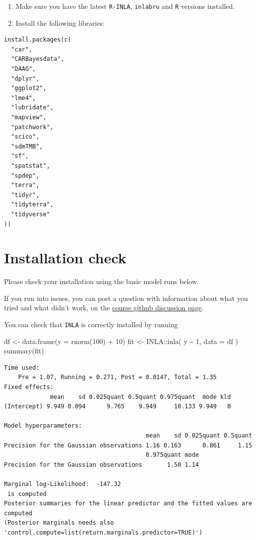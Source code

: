 \documentclass[
  letterpaper,
  DIV=11,
  numbers=noendperiod]{scrartcl}
\newenvironment{Shaded}{\begin{snugshade}}{\end{snugshade}}
\newcommand{\AttributeTok}[1]{\textcolor[rgb]{0.40,0.45,0.13}{#1}}
\newcommand{\DecValTok}[1]{\textcolor[rgb]{0.68,0.00,0.00}{#1}}
\newcommand{\FunctionTok}[1]{\textcolor[rgb]{0.28,0.35,0.67}{#1}}
\newcommand{\NormalTok}[1]{\textcolor[rgb]{0.00,0.23,0.31}{#1}}
\newcommand{\OtherTok}[1]{\textcolor[rgb]{0.00,0.23,0.31}{#1}}
\newcommand{\SpecialCharTok}[1]{\textcolor[rgb]{0.37,0.37,0.37}{#1}}
\begin{document}
\begin{enumerate}
\def\labelenumi{\arabic{enumi}.}
\setcounter{enumi}{2}
\item
  Make sure you have the latest \texttt{R-INLA}, \texttt{inlabru} and
  \texttt{R} versions installed.
\item
  Install the following libraries:
\end{enumerate}

\begin{verbatim}
install.packages(c(
  "car",
  "CARBayesdata",
  "DAAG",
  "dplyr",
  "ggplot2",
  "lme4",
  "lubridate",
  "mapview",
  "patchwork",
  "scico",
  "sdmTMB",
  "sf",
  "spatstat",
  "spdep",
  "terra",
  "tidyr",
  "tidyterra",
  "tidyverse"
))
\end{verbatim}

\section{Installation check}\label{installation-check}

Please check your installation using the basic model runs below.

If you run into issues, you can post a question with information about
what you tried and what didn't work, on the
\href{https://github.com/smar-git/inlabru_newCaledonia/discussions}{course
github discussion page}.

You can check that \texttt{INLA} is correctly installed by running

\begin{Shaded}
\begin{Highlighting}[]
\NormalTok{df }\OtherTok{\textless{}{-}} \FunctionTok{data.frame}\NormalTok{(}\AttributeTok{y =} \FunctionTok{rnorm}\NormalTok{(}\DecValTok{100}\NormalTok{) }\SpecialCharTok{+} \DecValTok{10}\NormalTok{)}
\NormalTok{fit }\OtherTok{\textless{}{-}}\NormalTok{ INLA}\SpecialCharTok{::}\FunctionTok{inla}\NormalTok{(}
\NormalTok{  y }\SpecialCharTok{\textasciitilde{}} \DecValTok{1}\NormalTok{,}
  \AttributeTok{data =}\NormalTok{ df}
\NormalTok{)}
\FunctionTok{summary}\NormalTok{(fit)}
\end{Highlighting}
\end{Shaded}

\begin{verbatim}
Time used:
    Pre = 1.07, Running = 0.271, Post = 0.0147, Total = 1.35 
Fixed effects:
             mean    sd 0.025quant 0.5quant 0.975quant  mode kld
(Intercept) 9.949 0.094      9.765    9.949     10.133 9.949   0

Model hyperparameters:
                                        mean    sd 0.025quant 0.5quant
Precision for the Gaussian observations 1.16 0.163      0.861     1.15
                                        0.975quant mode
Precision for the Gaussian observations       1.50 1.14

Marginal log-Likelihood:  -147.32 
 is computed 
Posterior summaries for the linear predictor and the fitted values are computed
(Posterior marginals needs also 'control.compute=list(return.marginals.predictor=TRUE)')
\end{verbatim}
\end{document}

